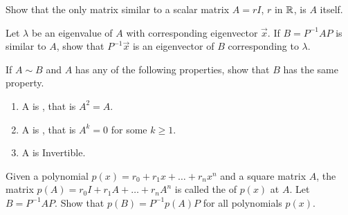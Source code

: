 \documentclass{ximera}
\begin{document}
\begin{problem}\label{prob:similarproperties_rI}
Show that the only matrix similar to a scalar matrix $A = rI$, $r$ in $\mathbb{R}$, is $A$ itself.
\end{problem}

\begin{problem}\label{prob:similarproperties_ev}
Let $\lambda$ be an eigenvalue of $A$ with corresponding eigenvector $\vec{x}$. If $B = P^{-1}AP$ is similar to $A$, show that $P^{-1}\vec{x}$ is an eigenvector of $B$ corresponding to $\lambda$.
\end{problem}

\begin{problem}\label{prob:moresimilarproperties}
If $A \sim B$ and $A$ has any of the following properties, show that $B$ has the same property.

\begin{enumerate}
\item\label{prob:moresimilarproperties_idempotent} A is , that is $A^{2} = A$.

\item\label{prob:moresimilarproperties_nilpotent} A is , that is $A^{k} = 0$ for some $k \geq 1$.

\item\label{prob:moresimilarproperties_invertible} A is Invertible.

\end{enumerate}
\end{problem}

\begin{problem}\label{prob:similar_poly_eval}
Given a polynomial $p(x) = r_{0} + r_{1}x + \dots + r_{n}x^{n}$ and a square matrix $A$, the matrix $p(A) = r_{0}I + r_{1}A + \dots  + r_{n}A^{n}$ is called the  of $p(x)$ at $A$. Let $B = P^{-1}AP$. Show that $p(B) = P^{-1}p(A)P$ for all polynomials $p(x)$.
\end{problem}
\end{document}
